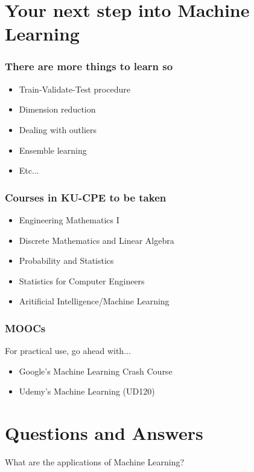 \documentclass[aspectratio=169]{beamer}
\begin{document}
\section{Your next step into Machine Learning}

\begin{frame}
	\frametitle{There are more things to learn so}
	\begin{itemize}
		\item<2-> Train-Validate-Test procedure
		\item<3-> Dimension reduction
		\item<4-> Dealing with outliers
		\item<5-> Ensemble learning
		\item<6-> Etc...
	\end{itemize}
\end{frame}

\begin{frame}
	\frametitle{Courses in KU-CPE to be taken}
	\begin{itemize}
		\item Engineering Mathematics I
		\item Discrete Mathematics and Linear Algebra
		\item Probability and Statistics
		\item Statistics for Computer Engineers
		\item Aritificial Intelligence/Machine Learning
	\end{itemize}
\end{frame}

\begin{frame}
	\frametitle{MOOCs}
	For practical use, go ahead with...
	\begin{itemize}
		\item Google's Machine Learning Crash Course
		\item Udemy's Machine Learning (UD120)
	\end{itemize}
\end{frame}

\section{Questions and Answers}

\begin{frame}
	\begin{center}
		\Large What are the applications of Machine Learning?
	\end{center}
\end{frame}
\end{document}
